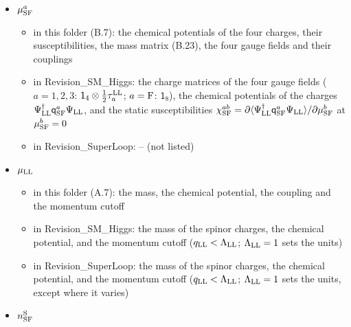 \documentclass[
  10pt,
]{article}
\providecommand{\tightlist}{%
  \setlength{\itemsep}{0pt}\setlength{\parskip}{0pt}}
\begin{document}
\begin{itemize}
  \begin{itemize}
  \tightlist
  \item
    in this folder (B.7, D): the gauge field of \(SU(2)_{\rm v}\), its
    three components, and the Pauli matrices acting on the isospin index
  \item
    in Revision\_SM\_Higgs: the gauge field of \(SU(2)_{\rm v}\) as a
    Hermitian traceless \(2\times2\) matrix,
    \(\sum_\iota W^\iota_{{\rm SF},p}\tau^{\rm LL}_\iota/2\); with two
    indices, \(\mathsf W_{{\rm SF},pp'}\), its field strength
    \(\partial_p\mathsf W_{{\rm SF},p'}-\partial_{p'}\mathsf W_{{\rm SF},p}+ig^{\rm v}_{\rm LL}[\mathsf W_{{\rm SF},p},\mathsf W_{{\rm SF},p'}]\)
  \item
    in Revision\_SuperLoop: -- (not listed)
  \end{itemize}
\item
  \(\mu^a_{\rm SF}\)

  \begin{itemize}
  \tightlist
  \item
    in this folder (B.7): the chemical potentials of the four charges,
    their susceptibilities, the mass matrix (B.23), the four gauge
    fields and their couplings
  \item
    in Revision\_SM\_Higgs: the charge matrices of the four gauge fields
    (\(a=1,2,3\): \(\mathsf 1_4\otimes\tfrac12\tau^{\rm LL}_a\);
    \(a={\rm F}\): \(\mathsf 1_8\)), the chemical potentials of the
    charges \(\Psi^\dagger_{\rm LL}\mathsf q^a_{\rm SF}\Psi_{\rm LL}\),
    and the static susceptibilities
    \(\chi^{ab}_{\rm SF}=\partial\langle\Psi^\dagger_{\rm LL}\mathsf q^a_{\rm SF}\Psi_{\rm LL}\rangle/\partial\mu^b_{\rm SF}\)
    at \(\mu^b_{\rm SF}=0\)
  \item
    in Revision\_SuperLoop: -- (not listed)
  \end{itemize}
\item
  \(\mu_{\rm LL}\)

  \begin{itemize}
  \tightlist
  \item
    in this folder (A.7): the mass, the chemical potential, the coupling
    and the momentum cutoff
  \item
    in Revision\_SM\_Higgs: the mass of the spinor charges, the chemical
    potential, and the momentum cutoff (\(q_{\rm LL}<\Lambda_{\rm LL}\);
    \(\Lambda_{\rm LL}=1\) sets the units)
  \item
    in Revision\_SuperLoop: the mass of the spinor charges, the chemical
    potential, and the momentum cutoff (\(q_{\rm LL}<\Lambda_{\rm LL}\);
    \(\Lambda_{\rm LL}=1\) sets the units, except where it varies)
  \end{itemize}
\item
  \(n^{\rm S}_{\rm SF}\)


\end{itemize}
\end{document}
